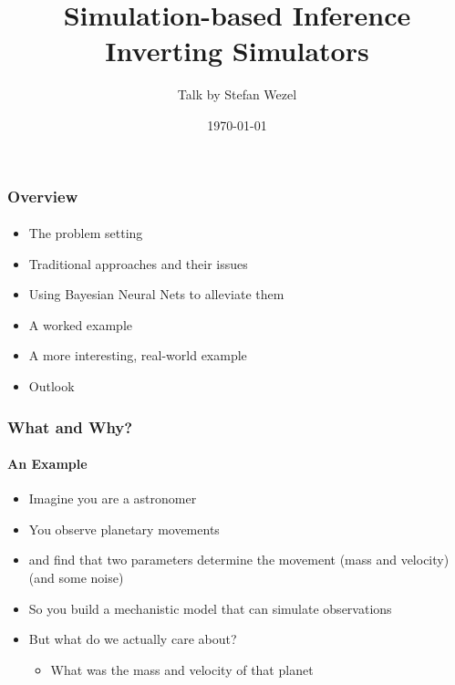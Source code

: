 \documentclass[9pt]{beamer}
\title{Simulation-based Inference \\
	\small Inverting Simulators}
\author{Talk by Stefan Wezel}
\institute{mlcolab @ Tübingen University Cluster of Excellence}
\date{\today}
\begin{document}
	

\begin{frame}[plain]
	\titlepage
\end{frame} 



\begin{frame}
\frametitle{Overview}
\framesubtitle{}
\begin{itemize}
	\item The problem setting %
	\item Traditional approaches and their issues
	\item Using Bayesian Neural Nets to alleviate them
	\item A worked example
	\item A more interesting, real-world example
	\item Outlook %
\end{itemize}
\end{frame} 






\begin{frame}
\frametitle{What and Why?}
\framesubtitle{An Example}
\begin{itemize}
	\item Imagine you are a astronomer
	\item You observe planetary movements
	\item and find that two parameters determine the movement (mass and velocity) (and some noise)
	\item So you build a mechanistic model that can simulate observations
	\item But what do we actually care about?
	\begin{itemize}
		\item What was the mass and velocity of that planet
	\end{itemize}
\end{itemize}
\end{frame} 
\end{document}

